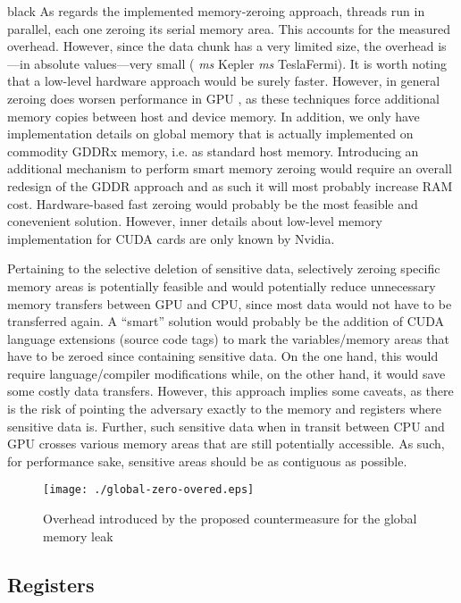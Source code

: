 \documentclass[11pt,onecolumn,letterpaper]{IEEEtran}
\newcommand{\clr}{black}
\begin{document}
\begin{color}{\clr}
\label{zeroing}
As regards the implemented memory-zeroing approach, threads run in parallel, each one zeroing its serial memory area. 
This accounts for the measured overhead. However, since the data chunk has a very limited size, the overhead is---in absolute values---very small
( \emph{ms} Kepler  \emph{ms} TeslaFermi). 
It is worth noting that a low-level hardware approach would be surely faster.
However, in general zeroing does worsen performance in GPU \cite{zeroingoverhead}, 
as these techniques force additional memory copies between host and device memory.
In addition, we only have implementation details on global memory that is actually implemented on commodity GDDRx memory, i.e. as standard host memory.
Introducing an additional mechanism to perform smart memory zeroing would require an overall redesign of the GDDR approach and as such it will most probably increase RAM cost. 
Hardware-based fast zeroing would probably be the most feasible and conevenient solution.
However, inner details about low-level memory implementation for CUDA cards are only known by Nvidia.

Pertaining to the selective deletion of sensitive data, selectively zeroing specific memory areas is potentially feasible
and would potentially reduce unnecessary memory transfers between GPU and CPU,
since most data would not have to be transferred again.
A ``smart'' solution would probably be the addition of CUDA language extensions (source code tags) 
to mark the variables/memory areas that have to be zeroed since containing sensitive data.
On the one hand, this would require language/compiler modifications while, on the other hand, it would save some costly data transfers. 
However, this approach implies some caveats,
as there is the risk of pointing the adversary exactly to the memory and registers where sensitive data is.
Further, such sensitive data when in transit between CPU and GPU crosses various memory areas that are still potentially accessible.
As such, for performance sake, sensitive areas should be as contiguous as possible.
\end{color}


\begin{figure}
	\centering
	\texttt{[image: ./global-zero-overed.eps]}
	\caption{Overhead introduced by the proposed countermeasure for the global memory leak}
	\label{fig:gbl-zero}
\end{figure}

\subsection{Registers}
\end{document}
